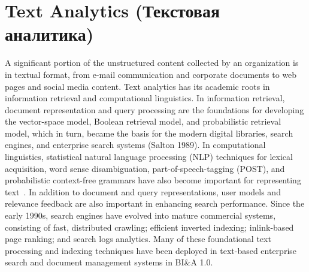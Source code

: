 \section{Text Analytics (Текстовая аналитика)}

A significant portion of the unstructured content collected by
an organization is in textual format, from e-mail communication
and corporate documents to web pages and social
media content. Text analytics has its academic roots in
information retrieval and computational linguistics. In information
retrieval, document representation and query processing
are the foundations for developing the vector-space
model, Boolean retrieval model, and probabilistic retrieval
model, which in turn, became the basis for the modern digital
libraries, search engines, and enterprise search systems
(Salton 1989). In computational linguistics, statistical natural
language processing (NLP) techniques for lexical acquisition,
word sense disambiguation, part-of-speech-tagging (POST),
and probabilistic context-free grammars have also become
important for representing text~\cite{Manning:1999}.
In addition to document and query representations, user
models and relevance feedback are also important in
enhancing search performance.
Since the early 1990s, search engines have evolved into
mature commercial systems, consisting of fast, distributed
crawling; efficient inverted indexing; inlink-based page
ranking; and search logs analytics. Many of these foundational
text processing and indexing techniques have been
deployed in text-based enterprise search and document
management systems in BI\&A 1.0.


